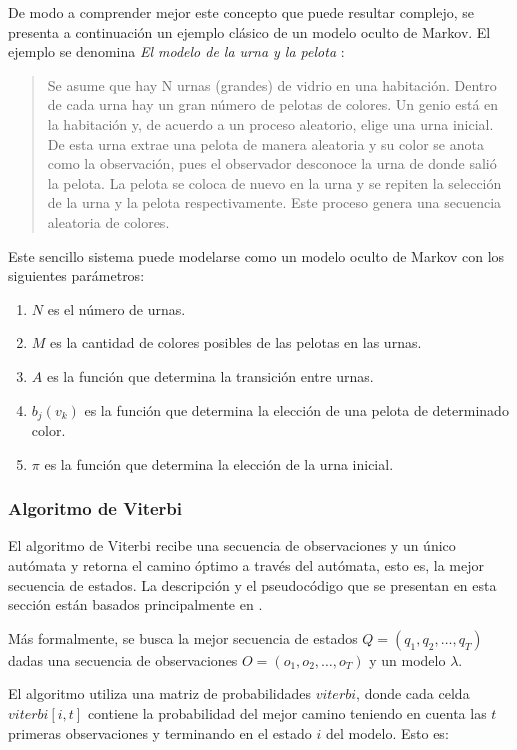 De modo a comprender mejor este concepto que puede resultar complejo, se presenta a continuaci\'on un ejemplo cl\'asico de un modelo oculto de
Markov. El ejemplo se denomina \emph{El modelo de la urna y la pelota} \cite{Rabiner89atutorial}:

\begin{quote}
	Se asume que hay N urnas (grandes) de vidrio en una habitaci\'on. Dentro de cada urna hay un gran n\'umero de pelotas de colores.
	Un genio est\'a en la habitaci\'on y, de acuerdo a un proceso aleatorio, elige una urna inicial. De esta urna extrae una pelota de
	manera aleatoria y su color se anota como la observaci\'on, pues el observador desconoce la urna de donde sali\'o la pelota.
	La pelota se coloca de nuevo en la urna y se repiten la selecci\'on de la urna y la pelota respectivamente. Este proceso genera
	una secuencia aleatoria de colores.
\end{quote}

Este sencillo sistema puede modelarse como un modelo oculto de Markov con los siguientes par\'ametros:
\begin{enumerate}
	\item $N$ es el n\'umero de urnas.
	\item $M$ es la cantidad de colores posibles de las pelotas en las urnas.
	\item $A$ es la funci\'on que determina la transici\'on entre urnas.
	\item $b_j(v_k)$ es la funci\'on que determina la elecci\'on de una pelota de determinado color.
	\item $\pi$ es la funci\'on que determina la elecci\'on de la urna inicial.
\end{enumerate}

\subsubsection{Algoritmo de Viterbi}
El algoritmo de Viterbi recibe una secuencia de observaciones y un \'unico aut\'omata y retorna el camino \'optimo a trav\'es
del aut\'omata, esto es, la mejor secuencia de estados. La descripci\'on y el pseudoc\'odigo que se presentan en esta secci\'on
est\'an basados principalmente en \cite{Jurafsky, Rabiner89atutorial}.

M\'as formalmente, se busca la mejor secuencia de estados $Q = (q_1,q_2,\ldots,q_T)$ dadas una secuencia de observaciones
$O = (o_1,o_2,\ldots,o_T)$ y un modelo $\lambda$.

El algoritmo utiliza una matriz de probabilidades $viterbi$, donde cada celda $viterbi[i,t]$ contiene la probabilidad del
mejor camino teniendo en cuenta las $t$ primeras observaciones y terminando en el estado $i$ del modelo. Esto es:

